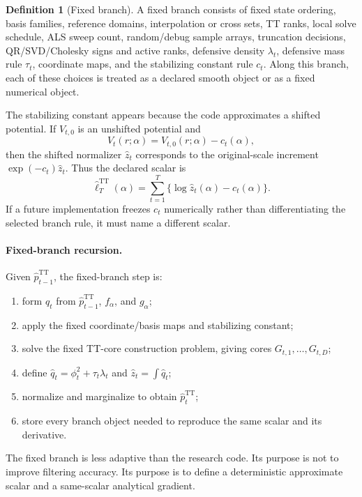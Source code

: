 \documentclass[11pt]{article}
\newcommand{\TT}{\mathrm{TT}}
\theoremstyle{definition}
\newtheorem{definition}{Definition}
\theoremstyle{remark}
\begin{document}
\begin{definition}[Fixed branch]
A fixed branch consists of fixed state ordering, basis families, reference
domains, interpolation or cross sets, TT ranks, local solve schedule, ALS sweep
count, random/debug sample arrays, truncation decisions, QR/SVD/Cholesky signs
and active ranks, defensive density \(\lambda_t\), defensive mass rule
\(\tau_t\), coordinate maps, and the stabilizing constant rule \(c_t\).  Along
this branch, each of these choices is treated as a declared smooth object or as
a fixed numerical object.
\end{definition}

The stabilizing constant appears because the code approximates a shifted
potential.  If \(V_{t,0}\) is an unshifted potential and
\[
  V_t(r;\alpha)=V_{t,0}(r;\alpha)-c_t(\alpha),
\]
then the shifted normalizer \(\widehat z_t\) corresponds to the original-scale
increment \(\exp(-c_t)\widehat z_t\).  Thus the declared scalar is
\[
  \widehat\ell_T^{\TT}(\alpha)
  =
  \sum_{t=1}^T\{\log\widehat z_t(\alpha)-c_t(\alpha)\}.
  \label{eq:p12-declared-scalar}
\]
If a future implementation freezes \(c_t\) numerically rather than
differentiating the selected branch rule, it must name a different scalar.

\paragraph{Fixed-branch recursion.}
Given \(\widehat p_{t-1}^{\TT}\), the fixed-branch step is:
\begin{enumerate}[leftmargin=*]
\item form \(q_t\) from \(\widehat p_{t-1}^{\TT}\), \(f_\alpha\), and
  \(g_\alpha\);
\item apply the fixed coordinate/basis maps and stabilizing constant;
\item solve the fixed TT-core construction problem, giving cores
  \(G_{t,1},\ldots,G_{t,D}\);
\item define \(\widehat q_t=\phi_t^2+\tau_t\lambda_t\) and
  \(\widehat z_t=\int\widehat q_t\);
\item normalize and marginalize to obtain
  \(\widehat p_t^{\TT}\);
\item store every branch object needed to reproduce the same scalar and its
  derivative.
\end{enumerate}
The fixed branch is less adaptive than the research code.  Its purpose is not
to improve filtering accuracy.  Its purpose is to define a deterministic
approximate scalar and a same-scalar analytical gradient.
\end{document}
